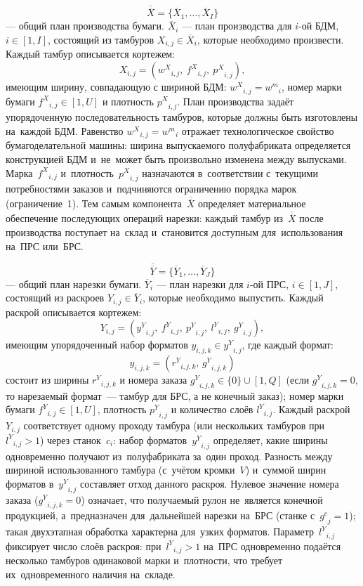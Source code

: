 \[
\overline{\overline{X}} = \{{\overline{X}}_{1},\ldots,{\overline{X}}_{I}\}
\]
--- общий план производства бумаги.
${\overline{X}}_{i}$ --- план производства для $i$-ой БДМ, $i \in [1, I]$, 
состоящий из тамбуров $X_{i,j} \in {\overline{X}}_{i}$, 
которые необходимо произвести.
Каждый тамбур описывается кортежем:
\[
X_{i,j} = ({{w^X}}_{i,j},\ {{f^X}}_{i,j},\ {{p^X}}_{i,j}),
\]
имеющим ширину, совпадающую с шириной БДМ: ${{w^X}}_{i,j} = {w^m}_{i}$, номер марки бумаги ${f^X}_{i,j} \in [1,U]$ и плотность ${p^X}_{i,j}$.
План производства задаёт упорядоченную последовательность тамбуров, которые должны быть изготовлены на~каждой БДМ.
Равенство ${{w^X}}_{i,j}={w^m}_{i}$ отражает технологическое свойство бумагоделательной машины: ширина выпускаемого полуфабриката определяется конструкцией БДМ и~не~может быть произвольно изменена между выпусками.
Марка~${f^X}_{i,j}$ и~плотность~${p^X}_{i,j}$ назначаются в~соответствии с~текущими потребностями заказов и~подчиняются ограничению порядка марок (ограничение~1).
Тем самым компонента~$\overline{\overline{X}}$ определяет материальное обеспечение последующих операций нарезки: каждый тамбур из~$\overline{\overline{X}}$ после производства поступает на~склад и~становится доступным для~использования на~ПРС или~БРС.

\[
\overline{\overline{Y}} = \{{\overline{Y}}_{1},\ldots,{\overline{Y}}_{J}\}
\]
--- общий план нарезки бумаги.
${\overline{Y}}_{i}$ --- план нарезки для $i$-ой ПРС, $i \in [1,J]$, состоящий из раскроев $Y_{i,j} \in {\overline{Y}}_{i}$, которые необходимо выпустить.
Каждый раскрой описывается кортежем:
\[
Y_{i,j} = ({{y^Y}}_{i,j},\ {{f^Y}}_{i,j},\ {{p^Y}}_{i,j},\ {{l^Y}}_{i,j},\ {{g^Y}}_{i,j}),
\]
имеющим упорядоченный набор форматов $y_{i,j,k} \in {{y^Y}}_{i,j}$, где каждый формат:
\[
y_{i,j,k} = ({r^Y}_{i,j,k},\,{{g^Y}}_{i,j,k})
\]
состоит из ширины ${r^Y}_{i,j,k}$ и номера заказа ${{g^Y}}_{i,j,k} \in \{0\} \cup [1,Q]$ (если ${{g^Y}}_{i,j,k} = 0$, то нарезаемый формат~--- тамбур для БРС, а не конечный заказ);
номер марки бумаги ${{f^Y}}_{i,j} \in [1,U]$, плотность ${{p^Y}}_{i,j}$ и количество слоёв ${{l^Y}}_{i,j}$.
Каждый раскрой~$Y_{i,j}$ соответствует одному проходу тамбура (или нескольких тамбуров при~${{l^Y}}_{i,j}>1$) через станок~$c_i$: набор форматов~${{y^Y}}_{i,j}$ определяет, какие ширины одновременно получают из~полуфабриката за~один проход.
Разность между шириной использованного тамбура (с~учётом кромки~$V$) и~суммой ширин форматов в~${{y^Y}}_{i,j}$ составляет отход данного раскроя.
Нулевое значение номера заказа (${{g^Y}}_{i,j,k}=0$) означает, что получаемый рулон не~является конечной продукцией, а~предназначен для~дальнейшей нарезки на~БРС (станке с~${g^c}_j=1$); такая двухэтапная обработка характерна для~узких форматов.
Параметр~${{l^Y}}_{i,j}$ фиксирует число слоёв раскроя: при~${{l^Y}}_{i,j}>1$ на~ПРС одновременно подаётся несколько тамбуров одинаковой марки и~плотности, что требует их~одновременного наличия на~складе.

